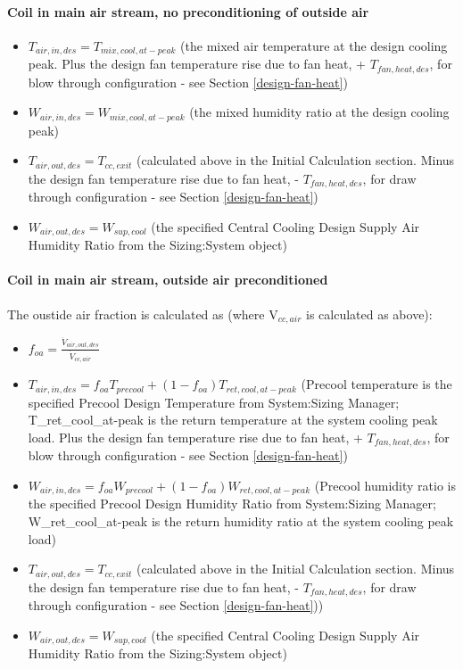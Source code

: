 \paragraph{\textbf{Coil in main air stream, no preconditioning of outside air} }\label{coil-in-main-air-stream-no-preconditioning-of-outside-air}

\begin{itemize}
\item
  \(T_{air,in,des} = T_{mix,cool,at-peak}\) (the mixed air temperature at the design cooling peak. Plus the design fan temperature rise due to fan heat, + \(T_{fan,heat,des}\), for blow through configuration - see Section \ref{design-fan-heat})
\item
  \(W_{air,in,des} = W_{mix,cool,at-peak}\) (the mixed humidity ratio at the design cooling peak)
\item
  \(T_{air,out,des} = T_{cc,exit}\) (calculated above in the Initial Calculation section. Minus the design fan temperature rise due to fan heat, - \(T_{fan,heat,des}\), for draw through configuration - see Section \ref{design-fan-heat})
\item
  \(W_{air,out,des} = W_{sup,cool}\) (the specified Central Cooling Design Supply Air Humidity Ratio from the Sizing:System object)
\end{itemize}

\paragraph{\textbf{Coil in main air stream, outside air preconditioned} }\label{coil-in-main-air-stream-outside-air-preconditioned}

The oustide air fraction is calculated as (where V\(_{cc,air}\) is calculated as above):

\begin{itemize}
\item
  \(f_{oa} = \frac{\dot V_{air,out,des}}{\dot{V}_{cc,air}}\)
\item
  \(T_{air,in,des} = f_{oa}T_{precool} + \left(1-f_{oa}\right)T_{ret,cool,at-peak}\) (Precool temperature is the specified Precool Design Temperature from System:Sizing Manager; T\_ret\_cool\_at-peak is the return temperature at the system cooling peak load. Plus the design fan temperature rise due to fan heat, + \(T_{fan,heat,des}\), for blow through configuration - see Section \ref{design-fan-heat})
\item
  \(W_{air,in,des} = f_{oa}W_{precool} + \left(1-f_{oa}\right)W_{ret,cool,at-peak}\) (Precool humidity ratio is the specified Precool Design Humidity Ratio from System:Sizing Manager; W\_ret\_cool\_at-peak is the return humidity ratio at the system cooling peak load)
\item
  \(T_{air,out,des} = T_{cc,exit}\) (calculated above in the Initial Calculation section. Minus the design fan temperature rise due to fan heat, - \(T_{fan,heat,des}\), for draw through configuration - see Section \ref{design-fan-heat}))
\item
  \(W_{air,out,des} = W_{sup,cool}\) (the specified Central Cooling Design Supply Air Humidity Ratio from the Sizing:System object)
\end{itemize}

